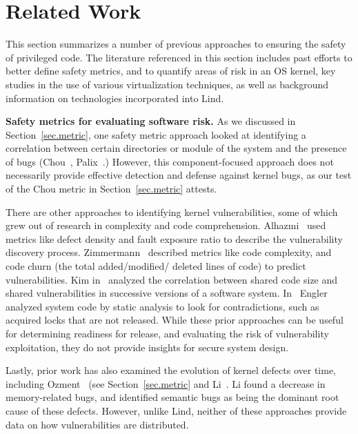 \section{Related Work}
\label{sec.related_work}

This section summarizes a number of previous approaches to ensuring the safety of
 privileged code. %
The literature referenced in this section includes past efforts to better define safety metrics,
and to quantify areas of risk in an OS kernel, key studies in the use of various virtualization
techniques, as well as background information on technologies incorporated into Lind.

\textbf{Safety metrics for evaluating software risk.}
As we discussed in Section~\ref{sec.metric}, one safety metric
approach looked at identifying a correlation between
certain directories or module of the system and the presence of bugs (Chou~\cite{PittSFIeld},
Palix~\cite{palix2011faults}.)
However, this component-focused approach does not necessarily
provide effective detection and defense against kernel bugs, as our test of the
Chou metric in Section~\ref{sec.metric} attests.

There are other approaches to identifying kernel vulnerabilities, some of
which grew out of research in complexity and code comprehension.
Alhazmi~\cite{alhazmi2008application}
used metrics like defect density and fault exposure ratio to describe the
vulnerability discovery process. Zimmermann~\cite{zimmermann2010searching}
described metrics like code complexity, and code churn (the total added/modified/
deleted lines of code) to predict vulnerabilities. Kim in~\cite{kim2007vulnerability} analyzed
the correlation between shared code size and shared vulnerabilities in
successive versions of a software system. In~\cite{engler2001bugs} Engler analyzed
system code by static analysis to look for contradictions, such as acquired locks that are
not released. While
these prior approaches can be useful for determining readiness for release, and
evaluating the risk of vulnerability exploitation,
they do not provide insights for secure system design.

Lastly, prior work has also examined the evolution of kernel defects over time, including
Ozment~\cite{ozment2006milk} (see Section~\ref{sec.metric} and Li~\cite{li2006have}.
Li found a decrease in memory-related
bugs, and identified semantic bugs as being the dominant root cause of these
defects.
However, unlike Lind, neither of these approaches provide data
on how vulnerabilities are distributed.

